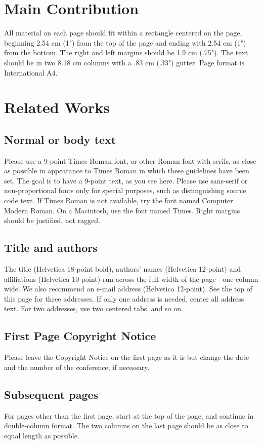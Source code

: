 \documentclass[acmtog, authorversion]{acmart}
\begin{document}
\section{Main Contribution}
All material on each page should fit within a rectangle centered on 
the page, beginning 2.54 cm (1") from the top of the page and ending 
with 2.54 cm (1") from the bottom.  The right and left margins should be 
1.9 cm (.75").  The text should be in two 8.18 cm columns with a .83 cm 
(.33") gutter. Page format is International A4.

\section{Related Works}
\subsection{Normal or body text}
Please use a 9-point Times Roman font, or other Roman font with 
serifs, as close as possible in appearance to Times Roman in which 
these guidelines have been set. The goal is to have a 9-point text, 
as you see here. Please use sans-serif or non-proportional fonts 
only for special purposes, such as distinguishing source code text. 
If Times Roman is not available, try the font named Computer Modern
Roman. On a Macintosh, use the font named Times. Right margins 
should be justified, not ragged.

\subsection{Title and authors}
The title (Helvetica 18-point bold), authors' names (Helvetica 
12-point) and affiliations (Helvetica 10-point) run across the full 
width of the page - one column wide. We also recommend an  e-mail 
address (Helvetica 12-point). See the top of this page for three 
addresses. If only one address is needed, center all address text. 
For two addresses, use two centered tabs, and so on.

\subsection{First Page Copyright Notice}
Please leave the Copyright Notice on the first page as it is but 
change the date and the number of the conference, if necessary.

\subsection{Subsequent pages}
For pages other than the first page, start at the top of the page, and 
continue in double-column format.  The two columns on the last page 
should be as close to equal length as possible.
\end{document}
